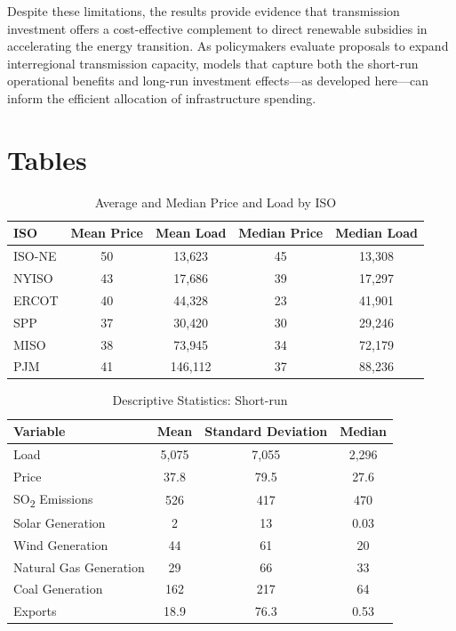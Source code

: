 \documentclass[12pt]{article}
\begin{document}
Despite these limitations, the results provide evidence that transmission investment offers a cost-effective complement to direct renewable subsidies in accelerating the energy transition. As policymakers evaluate proposals to expand interregional transmission capacity, models that capture both the short-run operational benefits and long-run investment effects---as developed here---can inform the efficient allocation of infrastructure spending.

\singlespacing
\setlength\bibsep{0pt}
\printbibliography




\clearpage

\onehalfspacing

\section*{Tables} \label{sec:tab}

\begin{table}[htbp]
\centering
\begin{tabular}{lcccc}
\toprule
\textbf{ISO} & \textbf{Mean Price} & \textbf{Mean Load} & \textbf{Median Price} & \textbf{Median Load} \\
\midrule
ISO-NE & 50 & 13{,}623 & 45 & 13{,}308 \\
NYISO  & 43 & 17{,}686 & 39 & 17{,}297 \\
ERCOT  & 40 & 44{,}328 & 23 & 41{,}901 \\
SPP    & 37 & 30{,}420 & 30 & 29{,}246 \\
MISO   & 38 & 73{,}945 & 34 & 72{,}179 \\
PJM    & 41 & 146{,}112 & 37 & 88{,}236 \\
\bottomrule
\end{tabular}
\caption{Average and Median Price and Load by ISO}
\label{priceData}
\end{table}

\begin{table}[htbp]
\centering
\begin{tabular}{lccc}
\toprule
\textbf{Variable} & \textbf{Mean} & \textbf{Standard Deviation} & \textbf{Median} \\
\midrule
Load & 5{,}075 & 7{,}055 & 2{,}296 \\
Price & 37.8 & 79.5 & 27.6 \\
SO\textsubscript{2} Emissions & 526 & 417 & 470 \\
Solar Generation & 2 & 13 & 0.03 \\
Wind Generation & 44 & 61 & 20 \\
Natural Gas Generation & 29 & 66 & 33 \\
Coal Generation & 162 & 217 & 64 \\
Exports & 18.9 & 76.3 & 0.53 \\
\bottomrule
\end{tabular}
\caption{Descriptive Statistics: Short-run}
\label{ShortTermStats1}
\end{table}
\end{document}
